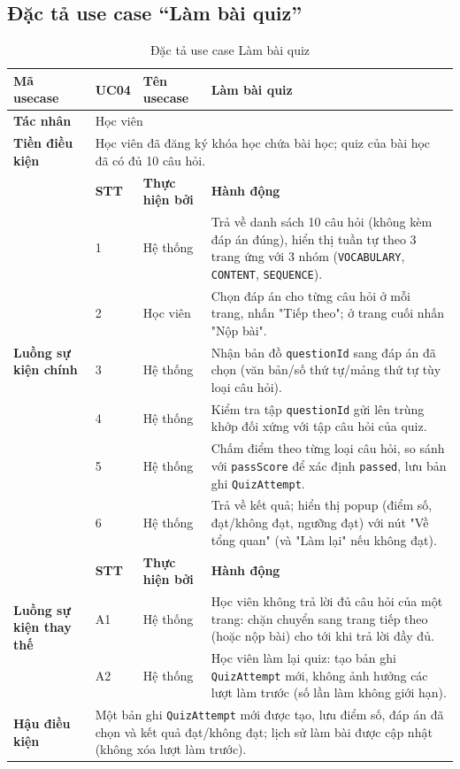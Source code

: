\documentclass[../DoAn.tex]{subfiles}
\begin{document}
\subsection{Đặc tả use case ``Làm bài quiz''}
\label{subsection:2.3.4}

\begin{table}[H]
\centering
\small
\renewcommand{\arraystretch}{1.3}
\begin{tabular}{|p{2.2cm}|p{1.4cm}|p{2.4cm}|p{7.0cm}|}
\hline
\textbf{Mã usecase} & \multicolumn{1}{l|}{UC04} & \textbf{Tên usecase} & Làm bài quiz \\ \hline
\textbf{Tác nhân} & \multicolumn{3}{l|}{Học viên} \\ \hline
\textbf{Tiền điều kiện} & \multicolumn{3}{p{11.0cm}|}{Học viên đã đăng ký khóa học chứa bài học; quiz của bài học đã có đủ 10 câu hỏi.} \\ \hline
\multirow{7}{2.2cm}{\textbf{Luồng sự kiện chính}} & \textbf{STT} & \textbf{Thực hiện bởi} & \textbf{Hành động} \\ \cline{2-4}
 & 1 & Hệ thống & Trả về danh sách 10 câu hỏi (không kèm đáp án đúng), hiển thị tuần tự theo 3 trang ứng với 3 nhóm (\texttt{VOCABULARY}, \texttt{CONTENT}, \texttt{SEQUENCE}). \\ \cline{2-4}
 & 2 & Học viên & Chọn đáp án cho từng câu hỏi ở mỗi trang, nhấn "Tiếp theo"; ở trang cuối nhấn "Nộp bài". \\ \cline{2-4}
 & 3 & Hệ thống & Nhận bản đồ \texttt{questionId} sang đáp án đã chọn (văn bản/số thứ tự/mảng thứ tự tùy loại câu hỏi). \\ \cline{2-4}
 & 4 & Hệ thống & Kiểm tra tập \texttt{questionId} gửi lên trùng khớp đối xứng với tập câu hỏi của quiz. \\ \cline{2-4}
 & 5 & Hệ thống & Chấm điểm theo từng loại câu hỏi, so sánh với \texttt{passScore} để xác định \texttt{passed}, lưu bản ghi \texttt{QuizAttempt}. \\ \cline{2-4}
 & 6 & Hệ thống & Trả về kết quả; hiển thị popup (điểm số, đạt/không đạt, ngưỡng đạt) với nút "Về tổng quan" (và "Làm lại" nếu không đạt). \\ \hline
\multirow{3}{2.2cm}{\textbf{Luồng sự kiện thay thế}} & \textbf{STT} & \textbf{Thực hiện bởi} & \textbf{Hành động} \\ \cline{2-4}
 & A1 & Hệ thống & Học viên không trả lời đủ câu hỏi của một trang: chặn chuyển sang trang tiếp theo (hoặc nộp bài) cho tới khi trả lời đầy đủ. \\ \cline{2-4}
 & A2 & Hệ thống & Học viên làm lại quiz: tạo bản ghi \texttt{QuizAttempt} mới, không ảnh hưởng các lượt làm trước (số lần làm không giới hạn). \\ \hline
\textbf{Hậu điều kiện} & \multicolumn{3}{p{11.0cm}|}{Một bản ghi \texttt{QuizAttempt} mới được tạo, lưu điểm số, đáp án đã chọn và kết quả đạt/không đạt; lịch sử làm bài được cập nhật (không xóa lượt làm trước).} \\ \hline
\end{tabular}
\renewcommand{\arraystretch}{1}
\caption{Đặc tả use case Làm bài quiz}
\label{table:2.6}
\end{table}
\end{document}
